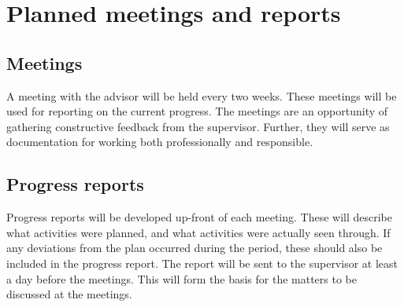 \chapter{Planned meetings and reports}

\section{Meetings}
A meeting with the advisor will be held every two weeks. These meetings will be used for reporting on the current progress. The meetings are an opportunity of gathering constructive feedback from the supervisor. Further, they will serve as documentation for working both professionally and responsible.

\section{Progress reports}
Progress reports will be developed up-front of each meeting. These will describe what activities were planned, and what activities were actually seen through. If any deviations from the plan occurred during the period, these should also be included in the progress report. The report will be sent to the supervisor at least a day before the meetings. This will form the basis for the matters to be discussed at the meetings.